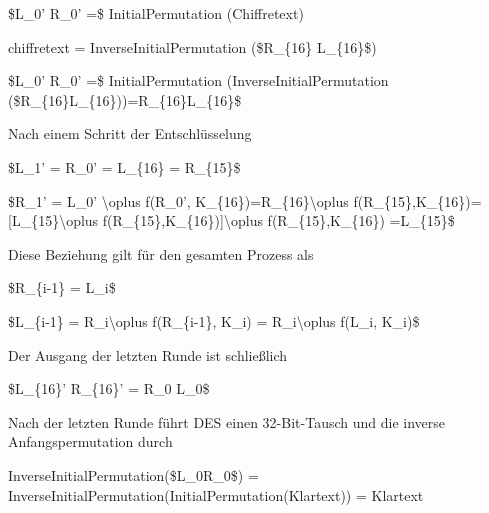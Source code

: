 \documentclass[a4paper]{article}
\begin{document}
\begin{multicols}{3}
\begin{itemize*}
            \begin{itemize*}
                  \item \$L\_0' \textbar\textbar{} R\_0' =\$ InitialPermutation (Chiffretext)
                  \item chiffretext = InverseInitialPermutation (\$R\_\{16\} \textbar\textbar{} L\_\{16\}\$)
                  \item \$L\_0' \textbar\textbar{} R\_0' =\$ InitialPermutation (InverseInitialPermutation (\$R\_\{16\}\textbar\textbar L\_\{16\}))=R\_\{16\}\textbar\textbar L\_\{16\}\$
            \end{itemize*}
            \item
            Nach einem Schritt der Entschlüsselung

            \begin{itemize*}
                  \item \$L\_1' = R\_0' = L\_\{16\} = R\_\{15\}\$
                  \item \$R\_1' = L\_0' \textbackslash oplus f(R\_0', K\_\{16\})=R\_\{16\}\textbackslash oplus f(R\_\{15\},K\_\{16\})={[}L\_\{15\}\textbackslash oplus f(R\_\{15\},K\_\{16\}){]}\textbackslash oplus f(R\_\{15\},K\_\{16\}) =L\_\{15\}\$
            \end{itemize*}
            \item
            Diese Beziehung gilt für den gesamten Prozess als

            \begin{itemize*}
                  \item \$R\_\{i-1\} = L\_i\$
                  \item \$L\_\{i-1\} = R\_i\textbackslash oplus f(R\_\{i-1\}, K\_i) = R\_i\textbackslash oplus f(L\_i, K\_i)\$
            \end{itemize*}
            \item
            Der Ausgang der letzten Runde ist schließlich

            \begin{itemize*}
                  \item \$L\_\{16\}' \textbar\textbar{} R\_\{16\}' = R\_0 \textbar\textbar{} L\_0\$
            \end{itemize*}
            \item
            Nach der letzten Runde führt DES einen 32-Bit-Tausch und die inverse
            Anfangspermutation durch

            \begin{itemize*}
                  \item InverseInitialPermutation(\$L\_0\textbar\textbar R\_0\$) = InverseInitialPermutation(InitialPermutation(Klartext)) = Klartext
            \end{itemize*}
      \end{itemize*}



\end{multicols}
\end{document}
